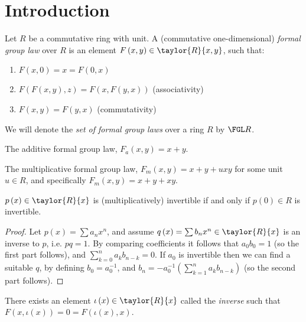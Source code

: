 \section{Introduction}

\begin{definition*}
	Let $R$ be a commutative ring with unit.
	A (commutative one-dimensional) \emph{formal group law} over $R$ is an element $F\left(x,y\right) \in \taylor{R}{x,y}$, such that:
	\begin{enumerate}
		\item $F\left(x,0\right) = x = F\left(0,x\right)$
		\item $F\left(F\left(x,y\right),z\right)=F\left(x,F\left(y,x\right)\right)$ (associativity)
		\item $F\left(x,y\right)=F\left(y,x\right)$ (commutativity)
	\end{enumerate}
	We will denote the \emph{set of formal group laws} over a ring $R$ by $\FGL R$.
\end{definition*}

\begin{example*}
	The additive formal group law, $F_a\left(x,y\right) = x+y$.
\end{example*}

\begin{example*}
	The multiplicative formal group law, $F_m\left(x,y\right) = x+y+uxy$ for some unit $u\in R$, and specifically $F_m\left(x,y\right) = x+y+xy$.
\end{example*}

\begin{lemma*}
	$p\left(x\right) \in \taylor{R}{x}$ is (multiplicatively) invertible if and only if $p\left(0\right) \in R$ is invertible.
\end{lemma*}
\begin{proof}
	Let $p\left(x\right) = \sum a_n x^n$, and assume $q\left(x\right) = \sum b_n x^n \in \taylor{R}{x}$ is an inverse to $p$, i.e. $pq = 1$. 
	By comparing coefficients it follows that $a_0 b_0 = 1$ (so the first part follows), and $\sum_{k=0}^n a_k b_{n-k} = 0$.
	If $a_0$ is invertible then we can find a suitable $q$, by defining $b_0 = a_0^{-1}$, and $b_n = - a_0^{-1} \left(\sum_{k=1}^n a_k b_{n-k}\right)$ (so the second part follows).
\end{proof}

\begin{lemma*}
	There exists an element $\iota\left(x\right) \in \taylor{R}{x}$ called the \emph{inverse} such that
	$
		F\left(x,\iota\left(x\right)\right)
		= 0
		= F\left(\iota\left(x\right),x\right)
	$.
\end{lemma*}

